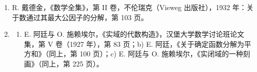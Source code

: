 \begin{enumerate}
  G. 弗罗贝尼乌斯与 L. 施蒂克尔贝格，《关于可交换元素的群》，J. de Crelle，第 LXXXVI 卷（1879 年），第 217 页（= 弗罗贝尼乌斯，《全集》，第 I 卷，第 545 页）。
\item
  R. 戴德金，《数学全集》，第 II 卷，不伦瑞克（Vieweg 出版社），1932 年：关于数通过其最大公因子的分解，第 103 页。
\item
  \begin{enumerate}
  \def\labelenumii{\alph{enumii})}
  \tightlist
  \item
    E. 阿廷与 O. 施赖埃尔，《实域的代数构造》，汉堡大学数学讨论班论文集，第 V 卷（1927 年），第 83 页；b) E. 阿廷，《关于确定函数分解为平方和》（同上，第 100 页）；c) E. 阿廷与 O. 施赖埃尔，《实闭域的一种刻画》（同上，第 225 页）。
  \end{enumerate}
\end{enumerate}

